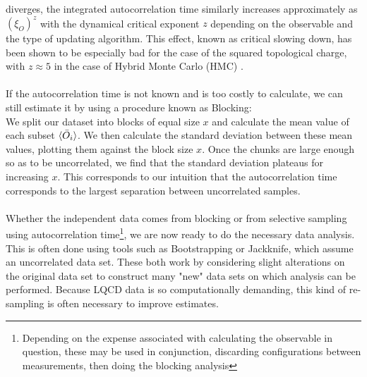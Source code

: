 \documentclass[a4paper,10pt]{book}
\begin{document}
diverges, the integrated autocorrelation time similarly increases approximately as $\left(\xi_{O}\right)^{z}$ with the dynamical critical exponent $z$ depending on the observable and the type of updating algorithm. This effect, known as critical slowing down, has been shown to be especially bad for the case of the squared topological charge, with $z\approx 5$ in the case of Hybrid Monte Carlo (HMC) \cite{2011}.\\\\If the autocorrelation time is not known and is too costly to calculate, we can still estimate it by using a procedure known as Blocking:\\We split our dataset into blocks of equal size $x$ and calculate the mean value of each subset $\braket{\bar{O}_i}$. We then calculate the standard deviation between these mean values, plotting them against the block size $x$. Once the chunks are large enough so as to be uncorrelated, we find that the standard deviation plateaus for increasing $x$. This corresponds to our intuition that the autocorrelation time corresponds to the largest separation between uncorrelated samples.\\\\Whether the independent data comes from blocking or from selective sampling using autocorrelation time\footnote{Depending on the expense associated with calculating the observable in question, these may be used in conjunction, discarding configurations between measurements, then doing the blocking analysis}, we are now ready to do the necessary data analysis. This is often done using tools such as Bootstrapping or Jackknife, which assume an uncorrelated data set. These both work by considering slight alterations on the original data set to construct many "new" data sets on which analysis can be performed. Because LQCD data is so computationally demanding, this kind of re-sampling is often necessary to improve estimates.
\end{document}
